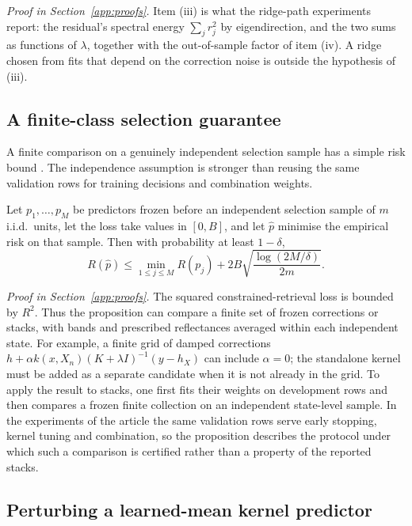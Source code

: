 \noindent\emph{Proof in Section~\ref{app:proofs}.}
Item (iii) is what the ridge-path experiments report: the residual's spectral energy $\sum_j r_j^2$ by eigendirection,
and the two sums as functions of $\lambda$, together with the out-of-sample factor of item (iv). A ridge chosen from
fits that depend on the correction noise is outside the hypothesis of (iii).

\subsection{A finite-class selection guarantee}\label{sec:damped}

A finite comparison on a genuinely independent selection sample has a simple risk bound
\cite{stonecv,gcv,arlot}. The independence assumption is stronger than reusing the same
validation rows for training decisions and combination weights.

\begin{proposition}\label{prop:selection}
Let $p_1,\dots,p_M$ be predictors frozen before an independent selection sample of $m$ i.i.d.\ units, let the loss
take values in $[0,B]$, and let $\widehat p$ minimise the empirical risk on that sample. Then with probability at
least $1-\delta$,
\[
R(\widehat p)\le\min_{1\le j\le M}R(p_j)+2B\sqrt{\frac{\log(2M/\delta)}{2m}} .
\]
\end{proposition}

\noindent\emph{Proof in Section~\ref{app:proofs}.}
The squared constrained-retrieval loss is bounded by $R^2$. Thus the proposition can
compare a finite set of frozen corrections or stacks, with bands and prescribed
reflectances averaged within each independent state. For example, a finite grid of
damped corrections $h+\alpha k(x,X_n)(K+\lambda I)^{-1}(y-h_X)$ can include $\alpha=0$;
the standalone kernel must be added as a separate candidate when it is not already in
the grid. To apply the result to stacks, one first fits their weights on development
rows and then compares a frozen finite collection on an independent state-level sample.
In the experiments of the article the same validation rows serve early stopping, kernel tuning and
combination, so the proposition describes the protocol under which such a comparison is
certified rather than a property of the reported stacks.

\subsection{Perturbing a learned-mean kernel predictor}\label{sec:perturb}

